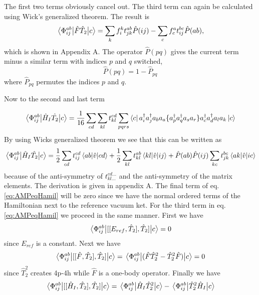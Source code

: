 \documentclass[a4paper,12pt]{article}
\newcommand{\hatTt}{\hat{T}_2}
\newcommand{\brak}[2]{\mel{#1}{\hat{v}}{#2}}
\newcommand{\ad}{a^\dagger}
\newcommand{\phiijab}{\Phi_{ij}^{ab}}
\newcommand{\Phat}[1]{\hat{P}(#1)}
\begin{document}
The first two terms obviously cancel out. The third term can again be calculated using Wick's generalized theorem. The result is
\begin{equation}
    \mel{\phiijab}{\hat{F}\hatTt}{c}=\sum_kf_i^kt_{jk}^{ab}\Phat{ij}-\sum_cf_c^at_{ij}^{bc}\Phat{ab},
\end{equation}
which is shown in Appendix A. The operator $\Phat{pq}$ gives the current term minus a similar term with indices $p$ and $q$ switched,
\begin{equation}
    \Phat{pq}=1-\hat{P}_{pq}
\end{equation}
where $\hat{P}_{pq}$ permutes the indices $p$ and $q$.

Now to the second and last term

\begin{equation}
\mel{\Phi_{ij}^{ab}}{\hat{H}_I\hat{T_2}}{c} = \frac{1}{16} \sum_{cd} \sum_{kl} t_{kl}^{cd} \sum_{pqrs} \bra{c} \ad_i \ad_j a_b a_a \{\ad_p \ad_q a_s a_r \} \ad_c \ad_d a_l a_k \ket{c}
\end{equation}
By using Wicks generalized theorem we see that this can be written as
\begin{equation}
\mel{\Phi_{ij}^{ab}}{\hat{H}_I\hat{T_2}}{c} = \frac{1}{2} \sum_{cd} t_{ij}^{cd}\brak{ab}{cd} + \frac{1}{2} \sum_{kl} t_{kl}^{ab} \brak{kl}{ij} + \hat{P}(ab)\hat{P}(ij)\sum_{kc}t_{jk}^{bc}\brak{ak}{ic}
\end{equation}
because of the anti-symmetry of $t_{kl...}^{cd...}$ and the anti-symmetry of the matrix elements. The derivation is given in appendix A. The final term of eq. \ref{eq:AMPeqHamil} will be zero since we have the normal ordered terms of the Hamiltonian next to the reference vacuum ket.\newline
For the third term in eq. \ref{eq:AMPeqHamil} we proceed in the same manner. First we have
\begin{equation*}
    \mel{\Phi_{ij}^{ab}}{[[E_{ref},\hatTt],\hatTt]}{c} = 0
\end{equation*}
since $E_{ref}$ is a constant. Next we have
\begin{equation*}
    \mel{\Phi_{ij}^{ab}}{[[\hat{F},\hatTt],\hatTt]}{c} = \mel{\Phi_{ij}^{ab}}{(\hat{F}\hatTt^2 - \hatTt^2\hat{F})}{c} = 0
\end{equation*}
since $\hatTt^2$ creates 4p-4h while $\hat{F}$ is a one-body operator.
Finally we have
\begin{equation*}
    \mel{\Phi_{ij}^{ab}}{[[\hat{H}_I,\hatTt],\hatTt]}{c} = \mel{\Phi_{ij}^{ab}}{\hat{H}_I\hatTt^2}{c} - \mel{\Phi_{ij}^{ab}}{\hatTt^2 \hat{H}_I}{c}
\end{equation*}
\end{document}
